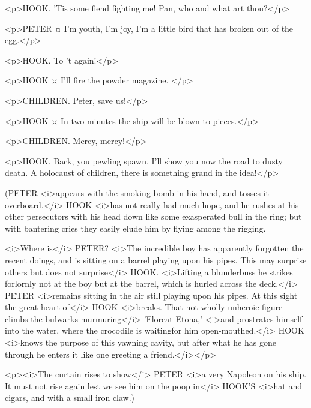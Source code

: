 <p>HOOK. 'Tis some fiend fighting me! Pan, who and what art thou?</p>


<p>PETER ¤
I'm youth, I'm joy, I'm a little bird that has broken out of the egg.</p>

<p>HOOK. To 't again!</p>


<p>HOOK ¤
I'll fire the powder magazine.
</p>

<p>CHILDREN. Peter, save us!</p>


<p>HOOK ¤
In two minutes the ship will be blown to pieces.</p>


<p>CHILDREN. Mercy, mercy!</p>

<p>HOOK. Back, you pewling spawn. I'll show you now the road to dusty death. A holocaust of children, there is something grand in the idea!</p>

\begin{stagedir}
(PETER <i>appears with the smoking bomb in his hand, and tosses it overboard.</i> HOOK <i>has not really had much hope, and he rushes at his other persecutors with his head down like some exasperated bull in the ring; but with bantering cries they easily elude him by flying among the rigging.

<i>Where is</i> PETER? <i>The incredible boy has apparently forgotten the recent doings, and is sitting on a barrel playing upon his pipes. This may surprise others but does not surprise</i> HOOK. <i>Lifting a blunderbuss he strikes forlornly not at the boy but at the barrel, which is hurled across the deck.</i> PETER <i>remains sitting in the air still playing upon his pipes. At this sight the great heart of</i> HOOK <i>breaks. That not wholly unheroic figure climbs the bulwarks murmuring</i> 'Floreat Etona,' <i>and prostrates himself into the water, where the crocodile is waitingfor him open-mouthed.</i> HOOK <i>knows the purpose of this yawning cavity, but after what he has gone through he enters it like one greeting a friend.</i></p>

<p><i>The curtain rises to show</i> PETER <i>a very Napoleon on his ship. It must not rise again lest we see him on the poop in</i> HOOK'S <i>hat and cigars, and with a small iron claw.)
\end{stagedir}
